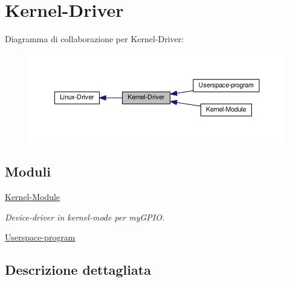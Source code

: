 \hypertarget{group___kernel-_driver}{\section{Kernel-\/\+Driver}
\label{group___kernel-_driver}
}
Diagramma di collaborazione per Kernel-\/\+Driver\+:\nopagebreak
\begin{figure}[H]
\begin{center}
\leavevmode
\includegraphics[width=350pt]{group___kernel-_driver}
\end{center}
\end{figure}
\subsection*{Moduli}
\begin{DoxyCompactItemize}
\item 
\hyperlink{group___kernel-_module}{Kernel-\/\+Module}
\begin{DoxyCompactList}\small\item\em Device-\/driver in kernel-\/mode per my\+G\+P\+I\+O. \end{DoxyCompactList}\item 
\hyperlink{group___userspace-program}{Userspace-\/program}
\end{DoxyCompactItemize}


\subsection{Descrizione dettagliata}
